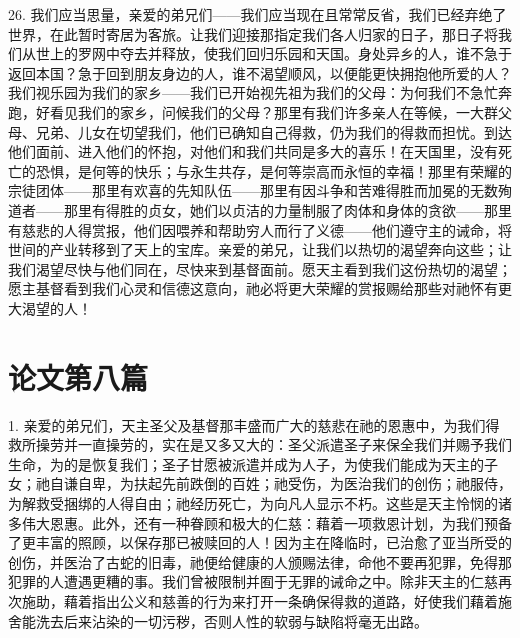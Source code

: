 26. 我们应当思量，亲爱的弟兄们——我们应当现在且常常反省，我们已经弃绝了世界，在此暂时寄居为客旅。让我们迎接那指定我们各人归家的日子，那日子将我们从世上的罗网中夺去并释放，使我们回归乐园和天国。身处异乡的人，谁不急于返回本国？急于回到朋友身边的人，谁不渴望顺风，以便能更快拥抱他所爱的人？我们视乐园为我们的家乡——我们已开始视先祖为我们的父母：为何我们不急忙奔跑，好看见我们的家乡，问候我们的父母？那里有我们许多亲人在等候，一大群父母、兄弟、儿女在切望我们，他们已确知自己得救，仍为我们的得救而担忧。到达他们面前、进入他们的怀抱，对他们和我们共同是多大的喜乐！在天国里，没有死亡的恐惧，是何等的快乐；与永生共存，是何等崇高而永恒的幸福！那里有荣耀的宗徒团体——那里有欢喜的先知队伍——那里有因斗争和苦难得胜而加冕的无数殉道者——那里有得胜的贞女，她们以贞洁的力量制服了肉体和身体的贪欲——那里有慈悲的人得赏报，他们因喂养和帮助穷人而行了义德——他们遵守主的诫命，将世间的产业转移到了天上的宝库。亲爱的弟兄，让我们以热切的渴望奔向这些；让我们渴望尽快与他们同在，尽快来到基督面前。愿天主看到我们这份热切的渴望；愿主基督看到我们心灵和信德这意向，祂必将更大荣耀的赏报赐给那些对祂怀有更大渴望的人！\par



\section{论文第八篇}

\par

\par

1. 亲爱的弟兄们，天主圣父及基督那丰盛而广大的慈悲在祂的恩惠中，为我们得救所操劳并一直操劳的，实在是又多又大的：圣父派遣圣子来保全我们并赐予我们生命，为的是恢复我们；圣子甘愿被派遣并成为人子，为使我们能成为天主的子女；祂自谦自卑，为扶起先前跌倒的百姓；祂受伤，为医治我们的创伤；祂服侍，为解救受捆绑的人得自由；祂经历死亡，为向凡人显示不朽。这些是天主怜悯的诸多伟大恩惠。此外，还有一种眷顾和极大的仁慈：藉着一项救恩计划，为我们预备了更丰富的照顾，以保存那已被赎回的人！因为主在降临时，已治愈了亚当所受的创伤，并医治了古蛇的旧毒，祂便给健康的人颁赐法律，命他不要再犯罪，免得那犯罪的人遭遇更糟的事。我们曾被限制并囿于无罪的诫命之中。除非天主的仁慈再次施助，藉着指出公义和慈善的行为来打开一条确保得救的道路，好使我们藉着施舍能洗去后来沾染的一切污秽，否则人性的软弱与缺陷将毫无出路。\par

